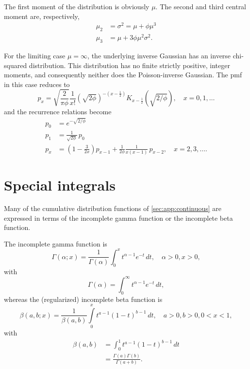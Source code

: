 \documentclass[x11names]{article}
\begin{document}
The first moment of the distribution is obviously $\mu$. The second
and third central moment are, respectively,
\begin{align*}
  \mu_2 &= \sigma^2 = \mu + \phi\mu^3 \\
  \mu_3 &= \mu + 3 \phi \mu^2 \sigma^2.
\end{align*}

For the limiting case $\mu = \infty$, the underlying inverse Gaussian
has an inverse chi-squared distribution. This distribution has no
finite strictly positive, integer moments, and consequently neither
does the Poisson-inverse Gaussian. The pmf in this case reduces to
\begin{equation*}
  p_x = \sqrt{\frac{2}{\pi \phi}} \frac{1}{x!}
  (\sqrt{2\phi})^{-(x - \frac{1}{2})} K_{x - \frac{1}{2}}
  (\sqrt{2/\phi}),
  \quad x = 0, 1, \dots
\end{equation*}
and the recurrence relations become
\begin{align*}
  p_0 &= e^{-\sqrt{2/\phi}} \\
  p_1 &= \frac{1}{\sqrt{2\phi}}\, p_0 \\
  p_x &= \left( 1 - \frac{3}{2x} \right) p_{x - 1}
  + \frac{1}{2\phi} \frac{1}{x(x -
    1)}\, p_{x - 2}, \quad x = 2, 3, \dots.
\end{align*}


\section{Special integrals}
\label{sec:special-integrals}

Many of the cumulative distribution functions of
\autoref{sec:app:continuous} are expressed in terms of the incomplete
gamma function or the incomplete beta function.

The incomplete gamma function is
\begin{equation}
  \label{eq:pgamma}
  \Gamma(\alpha; x) = \frac{1}{\Gamma(\alpha)}
  \int_0^x t^{\alpha - 1} e^{-t}\, dt, \quad \alpha > 0, x > 0,
\end{equation}
with
\begin{equation*}
  \Gamma(\alpha) = \int_0^\infty t^{\alpha - 1} e^{-t}\, dt,
\end{equation*}
whereas the (regularized) incomplete beta function is
\begin{equation}
  \label{eq:pbeta}
  \beta(a, b; x) = \frac{1}{\beta(a, b)}
  \int\limits_0^x t^{a - 1} (1 - t)^{b - 1}\, dt, \quad a > 0, b > 0, 0 < x < 1,
\end{equation}
with
\begin{align*}
  \beta(a, b)
  &= \int_0^1 t^{a - 1} (1 - t)^{b - 1}\, dt \\
  &= \frac{\Gamma(a) \Gamma(b)}{\Gamma(a + b)}.
\end{align*}
\end{document}
